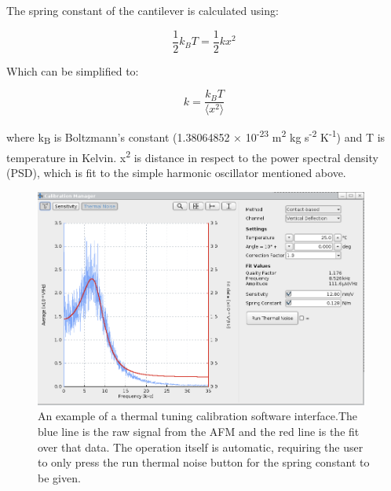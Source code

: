 The spring constant of the cantilever is calculated using:

\begin{equation}
\frac{1}{2}k_{B}T = \frac{1}{2}kx^{2}
\end{equation}

Which can be simplified to:

\begin{equation}
k = \frac{k_{B}T}{\langle x^{2} \rangle}
\end{equation}

where k\textsubscript{B} is Boltzmann's constant (1.38064852 × 10\textsuperscript{-23} m\textsuperscript{2} kg s\textsuperscript{-2} K\textsuperscript{-1}) and T is temperature in Kelvin. x\textsuperscript{2} is distance in respect to the power spectral density (PSD), which is fit to the simple harmonic oscillator mentioned above. \cite{ThermalCalc, JankThesis}

\begin{figure}[h!!!]     %
        \begin{center}
          \includegraphics[width=110mm]{chapter2/caliEg.png}
\end{center}
\caption{An example of a thermal tuning calibration software interface.The blue line is the raw signal from the AFM and the red line is the fit over that data. The operation itself is automatic, requiring the user to only press the run thermal noise button for the spring constant to be given.}
\label{fig:caliEg}                 %
\end{figure}



